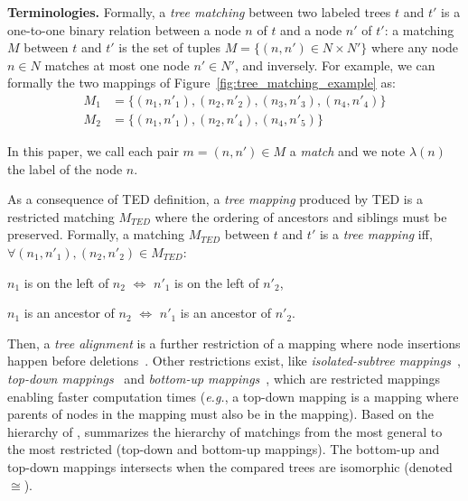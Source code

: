 \documentclass{vldb}
\begin{document}
\vspace{12pt}
\noindent\textbf{Terminologies.}
Formally, a \emph{tree matching} between two labeled trees $t$ and $t'$ is a one-to-one binary relation between a node $n$ of $t$ and a node $n'$ of $t'$: a matching $M$ between $t$ and $t'$ is the set of tuples $M=\{(n,n') \in N \times N'\}$ where any node $n \in N$ matches at most one node $n' \in N'$, and inversely.
For example, we can formally the two mappings of Figure~\ref{fig:tree_matching_example} as:
\begin{equation}
\begin{split}
M_1 & = \{(n_1, n'_1), (n_2, n'_2), (n_3, n'_3), (n_4, n'_4)\} \\
M_2 & = \{(n_1, n'_1), (n_2, n'_4), (n_4, n'_5)\}
\end{split}
\end{equation}

In this paper, we call each pair $m = (n,n') \in M$ a \textit{match} and we note $\lambda(n)$ the label of the node $n$.

As a consequence of TED definition, a \textit{tree mapping} produced by TED is a restricted matching $M_{TED}$ where the ordering of ancestors and siblings must be preserved.
Formally, a matching $M_{TED}$ between $t$ and $t'$ is a \emph{tree mapping} iff, $\forall (n_1, n'_1), (n_2, n'_2) \in M_{TED}$:
\begin{compactenum}
\item $n_1$ is on the left of $n_2$ $\iff$ $n'_1$ is on the left of $n'_2$,
\item $n_1$ is an ancestor of $n_2$ $\iff$ $n'_1$ is an ancestor of $n'_2$.
\end{compactenum}

Then, a \emph{tree alignment} is a further restriction of a mapping where node insertions happen before deletions~\cite{jiang1994alignment}.
Other restrictions exist, like \emph{isolated-subtree mappings}~\cite{TANAKA1988THEPROBLEM}, \emph{top-down mappings}~\cite{Chawathe1999ComparingMemory}
and \emph{bottom-up mappings}~\cite{valiente2001efficient}, which are restricted mappings enabling faster computation times (\emph{e.g.}, a top-down mapping is a mapping where parents of nodes in the mapping must also be in the mapping).
Based on the hierarchy of \cite{valiente2001efficient},  summarizes the hierarchy of matchings from the most general to the most restricted (top-down and bottom-up mappings). The bottom-up and top-down mappings intersects when the compared trees are isomorphic (denoted $\cong$).
\end{document}
